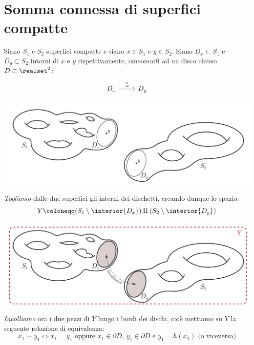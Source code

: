 \section{Somma connessa di superfici compatte}
Siano $S_1$ e $S_2$ superfici compatte e siano $x\in S_1$ e $y\in S_2$. Siano $D_x\subset S_1$ e $D_y\subset S_2$ intorni di $x$ e $y$ rispettivamente, omeomorfi ad un disco chiuso $D\subset\realset^2$:
\[\begin{tikzcd}
	{D_x} & {D_y}
	\arrow["{\stackrel{h}{\sim}}", from=1-1, to=1-2]
\end{tikzcd}\]
\begin{center}
	\includegraphics[trim=0cm 0cm 0cm 0cm, clip, scale=0.4]{images/connectedsum1.pdf}
\end{center}
\textit{Togliamo} dalle due superfici gli interni dei dischetti, creando dunque lo spazio:
\begin{equation*}
	Y\coloneqq (S_1\setminus \interior{D_x})\amalg (S_2\setminus \interior{D_y})
\end{equation*}
\begin{center}
	\includegraphics[trim=0cm 0cm 0cm 0cm, clip, scale=0.4]{images/connectedsum2.pdf}
\end{center}
\textit{Incolliamo} ora i due pezzi di $Y$ lungo i bordi dei dischi, cioè mettiamo su $Y$ la seguente relazione di equivalenza:
\begin{equation*}
	x_1\sim y_1 \iff x_1=y_1\text{ oppure } x_1\in\partial{D},\ y_1\in\partial{D}\text{ e } y_1=h(x_1)\text{ (o viceversa)} 
\end{equation*}
